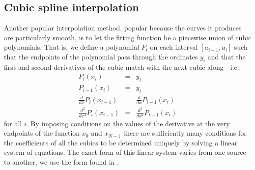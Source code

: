 \subsection{Cubic spline interpolation}
Another popular interpolation method, popular because the curves it
produces are particularly smooth, is to let the fitting function be a
piecewise union of cubic polynomials. That is, we define a polynomial
$P_i$ on each interval $[a_{i-1},a_i]$ such that the endpoints of the
polynomial pass through the ordinates $y_{i}$ and that the first and
second derivatives of the cubic match with the next cubic along -
i.e.:
\begin{eqnarray*}
P_i(x_i) &=& y_i \\
P_{i-1}(x_i) &=& y_i \\
\frac{d}{dx}P_i(x_{i-1}) &=& \frac{d}{dx}P_{i-1}(x_i) \\
\frac{d^2}{dx^2}P_i(x_{i-1}) &=& \frac{d^2}{dx^2}P_{i-1}(x_i) 
\end{eqnarray*}
for all $i$. By imposing conditions on the values of the derivative at
the very endpoints of the function $x_0$ and $x_{N-1}$ there are 
sufficiently many conditions for the coefficients of all the cubics to
be determined uniquely by solving a linear system of equations. The exact
form of this linear system varies from one source to another, we use 
the form found in \cite{book:SONA}.

